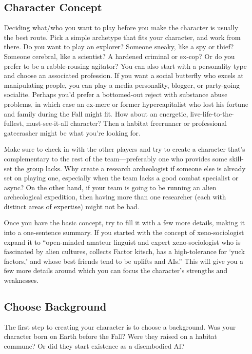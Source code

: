 \subsection{Character Concept}

Deciding what/who you want to play before you make 
the character is usually the best route. Pick a simple 
archetype that fits your character, and work from there. 
Do you want to play an explorer? Someone sneaky, 
like a spy or thief? Someone cerebral, like a scientist? 
A hardened criminal or ex-cop? Or do you prefer to 
be a rabble-rousing agitator? You can also start with a 
personality type and choose an associated profession. If 
you want a social butterfly who excels at manipulating 
people, you can play a media personality, blogger, or 
party-going socialite. Perhaps you'd prefer a bottomed-out
reject with substance abuse problems, in which
case an ex-merc or former hypercapitalist who lost 
his fortune and family during the Fall might fit. How 
about an energetic, live-life-to-the-fullest, must-see-it-all
character? Then a habitat freerunner or professional
gatecrasher might be what you're looking for.

Make sure to check in with the other players and 
try to create a character that's complementary to the 
rest of the team—preferably one who provides some 
skill-set the group lacks. Why create a research archeologist
if someone else is already set on playing one,
especially when the team lacks a good combat specialist
or async? On the other hand, if your team is going
to be running an alien archeological expedition, then 
having more than one researcher (each with distinct 
areas of expertise) might not be bad.

Once you have the basic concept, try to fill it with 
a few more details, making it into a one-sentence 
summary. If you started with the concept of xeno-sociologist
expand it to ``open-minded amateur linguist
and expert xeno-sociologist who is fascinated by alien 
cultures, collects Factor kitsch, has a high-tolerance 
for ‘yuck factors,' and whose best friends tend to be 
uplifts and AIs.'' This will give you a few more details 
around which you can focus the character's strengths 
and weaknesses.

\subsection{Choose Background}

The first step to creating your character is to choose a 
background. Was your character born on Earth before 
the Fall? Were they raised on a habitat commune? Or 
did they start existence as a disembodied AI?

